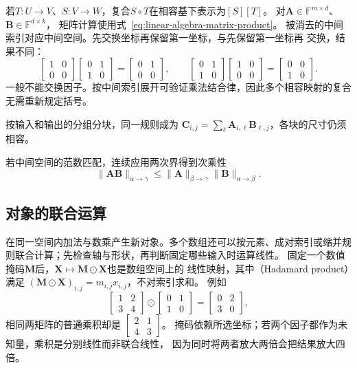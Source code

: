 若$T:U\to V$、$S:V\to W$，复合$S\circ T$在相容基下表示为$[S][T]$。
对$\bm A\in\mathbb F^{m\times d}$、$\bm B\in\mathbb F^{d\times k}$，
矩阵计算使用式~\eqref{eq:linear-algebra-matrix-product}。
被消去的中间索引对应中间空间。先交换坐标再保留第一坐标，与先保留第一坐标再
交换，结果不同：
\[
 \begin{bmatrix}1&0\\0&0\end{bmatrix}\begin{bmatrix}0&1\\1&0\end{bmatrix}
 =\begin{bmatrix}0&1\\0&0\end{bmatrix},\qquad
 \begin{bmatrix}0&1\\1&0\end{bmatrix}\begin{bmatrix}1&0\\0&0\end{bmatrix}
 =\begin{bmatrix}0&0\\1&0\end{bmatrix}.
\]
一般不能交换因子。按中间索引展开可验证乘法结合律，因此多个相容映射的复合无需重新规定括号。

按输入和输出的分组分块，同一规则成为
$\bm C_{i,j}=\sum_\ell\bm A_{i,\ell}\bm B_{\ell,j}$，各块的尺寸仍须相容。


若中间空间的范数匹配，连续应用两次界得到次乘性
\[
 \lVert\bm A\bm B\rVert_{\alpha\to\gamma}
 \leq\lVert\bm A\rVert_{\beta\to\gamma}
       \lVert\bm B\rVert_{\alpha\to\beta}.
\]


\subsection{对象的联合运算}
\label{sec:linear-algebra-joint-operations}

在同一空间内加法与数乘产生新对象。多个数组还可以按元素、成对索引或缩并规则联合计算；先检查轴与形状，再判断固定哪些输入时运算线性。
固定一个数值掩码$\bm M$后，$\bm X\mapsto\bm M\odot\bm X$也是数组空间上的
线性映射，其中（Hadamard product）满足
$(\bm M\odot\bm X)_{i,j}=m_{i,j}x_{i,j}$，不对索引求和。
例如
\[
 \begin{bmatrix}1&2\\3&4\end{bmatrix}
 \odot\begin{bmatrix}0&1\\1&0\end{bmatrix}
 =\begin{bmatrix}0&2\\3&0\end{bmatrix},
\]
相同两矩阵的普通乘积却是
$\left[\begin{smallmatrix}2&1\\4&3\end{smallmatrix}\right]$。
掩码依赖所选坐标；若两个因子都作为未知量，乘积是分别线性而非联合线性，
因为同时将两者放大两倍会把结果放大四倍。


